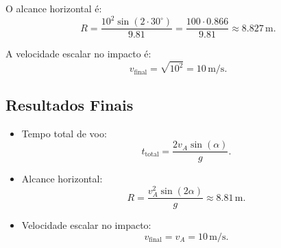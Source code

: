 O alcance horizontal é:
\[
R = \frac{10^2 \sin(2 \cdot 30^\circ)}{9.81} = \frac{100 \cdot 0.866}{9.81} \approx 8.827 \, \text{m}.
\]

A velocidade escalar no impacto é:
\[
v_{\text{final}} = \sqrt{10^2} = 10 \, \text{m/s}.
\]

\subsection*{Resultados Finais}
\begin{itemize}
    \item Tempo total de voo:
    \[
    t_{\text{total}} = \frac{2 v_A \sin(\alpha)}{g}.
    \]
    \item Alcance horizontal:
    \[
    R = \frac{v_A^2 \sin(2\alpha)}{g} \approx 8.81 \, \text{m}.
    \]
    \item Velocidade escalar no impacto:
    \[
    v_{\text{final}} = v_A = 10 \, \text{m/s}.
    \]
\end{itemize}
